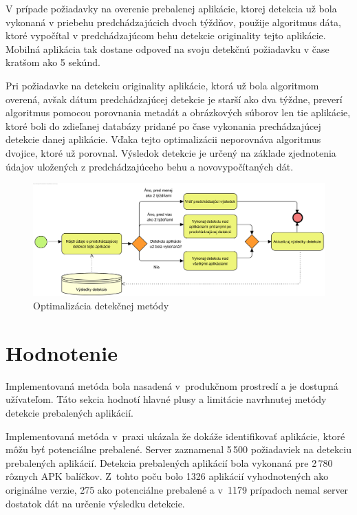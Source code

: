 V prípade požiadavky na overenie prebalenej aplikácie, ktorej detekcia už bola vykonaná v priebehu predchádzajúcich dvoch týždňov, použije algoritmus dáta, ktoré vypočítal v predchádzajúcom behu detekcie originality tejto aplikácie. Mobilná aplikácia tak dostane odpoveď na svoju detekčnú požiadavku v čase kratšom ako 5 sekúnd.

Pri požiadavke na detekciu originality aplikácie, ktorá už bola algoritmom overená, avšak dátum predchádzajúcej detekcie je starší ako dva týždne, preverí algoritmus pomocou porovnania metadát a obrázkových súborov len tie aplikácie, ktoré boli do zdieľanej databázy pridané po čase vykonania prechádzajúcej detekcie danej aplikácie. Vďaka tejto optimalizácii neporovnáva algoritmus dvojice, ktoré už porovnal. Výsledok detekcie je určený na základe zjednotenia údajov  uložených z predchádzajúceho behu a novovypočítaných dát. 

\begin{figure}[H]
  \begin{center}
    \includegraphics[width=130mm]{images/detection-optimalization.png}
  \end{center}
  \caption{Optimalizácia detekčnej metódy}
  \label{fig:detectionOriginal}
\end{figure}

\section{Hodnotenie}
\label{sec:hodnotenie}
Implementovaná metóda bola nasadená v~produkčnom prostredí a je dostupná užívateľom. Táto sekcia hodnotí hlavné plusy a limitácie navrhnutej metódy detekcie prebalených aplikácií.

Implementovaná metóda v~praxi ukázala že dokáže identifikovať aplikácie, ktoré môžu byť potenciálne prebalené. Server zaznamenal 5\,500 požiadaviek na detekciu prebalených aplikácií. Detekcia prebalených aplikácií bola vykonaná pre 2\,780 rôznych APK balíčkov.  Z~tohto poču bolo 1326 aplikácií vyhodnotených ako originálne verzie, 275 ako potenciálne prebalené a v~1179 prípadoch nemal server dostatok dát na určenie výsledku detekcie.


